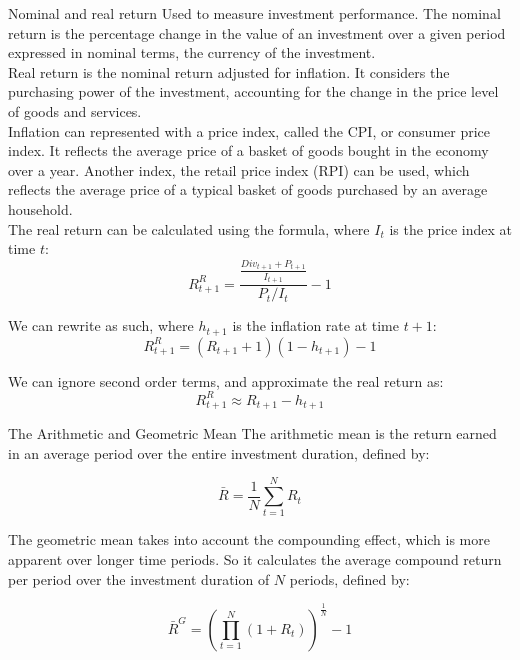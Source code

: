 \begin{definitionbox}{Nominal and real return}
    Used to measure investment performance. The nominal return is the percentage change in the value of an investment over a given period expressed in nominal terms, the currency of the investment.\\
    
    Real return is the nominal return adjusted for inflation. It considers the purchasing power of the investment, accounting for the change in the price level of goods and services.\\

    Inflation can represented with a price index, called the CPI, or consumer price index. It reflects the average price of a basket of goods bought in the economy over a year. Another index, the retail price index (RPI) can be used, which reflects the average price of a typical basket of goods purchased by an average household.\\

    The real return can be calculated using the formula, where $I_t$ is the price index at time $t$:
    \begin{equation}
        R^R_{t+1} = \frac{\frac{Div_{t+1} + P_{t+1}}{I_{t+1}}}{P_t / I_t} - 1
    \end{equation}

    We can rewrite as such, where $h_{t+1}$ is the inflation rate at time $t+1$:
    \begin{equation}
        R^R_{t+1} = (R_{t+1} + 1)(1-h_{t+1}) - 1
    \end{equation}

    We can ignore second order terms, and approximate the real return as:
    \begin{equation}
        R^R_{t+1} \approx R_{t+1} - h_{t+1}
    \end{equation}

\end{definitionbox}


\begin{definitionbox}{The Arithmetic and Geometric Mean}
    The arithmetic mean is the return earned in an average period over the entire investment duration, defined by:

    \begin{equation}
        \bar{R} = \frac{1}{N} \sum_{t=1}^{N} R_t
    \end{equation}



    The geometric mean takes into account the compounding effect, which is more apparent over longer time periods. So it calculates the average compound return per period over the investment duration of $N$ periods, defined by:

    \begin{equation}
        \bar{R}^G = \left( \prod_{t=1}^{N} (1 + R_t) \right)^{\frac{1}{N}} - 1
    \end{equation}


\end{definitionbox}




